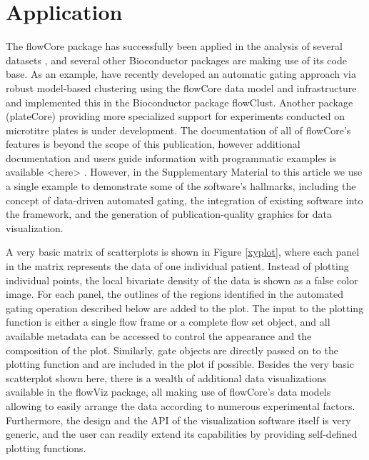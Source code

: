 \documentclass[12pt]{article}
\begin{document}
\section*{Application}
The flowCore package has successfully been applied in the analysis of
several datasets \citep{gasparetto2004ice,brinkman2007hcf}, and
several other Bioconductor packages are making use of its code
base. As an example, \cite{lo2008agf} have recently developed an
automatic gating approach via robust model-based clustering using the
flowCore data model and infrastructure and implemented this in the
Bioconductor package flowClust. Another package (plateCore) providing
more specialized support for experiments conducted on microtitre
plates is under development. The documentation of all of flowCore's
features is beyond the scope of this publication, however additional
documentation and users guide information with programmatic examples
is available <here> . However, in the Supplementary Material to this
article we use a single example to demonstrate some of the software's
hallmarks, including the concept of data-driven automated gating, the
integration of existing software into the framework, and the
generation of publication-quality graphics for data visualization.



A very basic matrix of scatterplots is shown in Figure \ref{xyplot},
where each panel in the matrix represents the data of one individual
patient. Instead of plotting individual points, the local bivariate
density of the data is shown as a false color image. For each panel,
the outlines of the regions identified in the automated gating
operation described below are added to the plot. The input to the
plotting function is either a single flow frame or a complete flow set
object, and all available metadata can be accessed to control the
appearance and the composition of the plot. Similarly, gate objects
are directly passed on to the plotting function and are included in
the plot if possible. Besides the very basic scatterplot shown here,
there is a wealth of additional data visualizations available in the
flowViz package\cite{sarkar2008ufv}, all making use of flowCore's data
models allowing to easily arrange the data according to numerous
experimental factors. Furthermore, the design and the API of the
visualization software itself is very generic, and the user can
readily extend its capabilities by providing self-defined plotting
functions.
\end{document}
